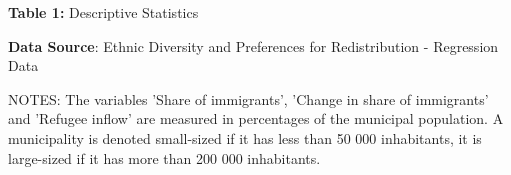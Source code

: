 \documentclass[12pt,a4paper]{standalone}
\begin{document}
\begin{minipage}[c][15cm]{1.8 \textwidth}

\thispagestyle{empty}

\begin{table}
\centering
\caption*{\textbf{Table 1:} Descriptive Statistics}

\begin{threeparttable}
 

    \begin{tablenotes}
    \item \textbf{Data Source}:
    Ethnic Diversity and Preferences for Redistribution - 		Regression Data 
    \item NOTES:
    The variables 'Share of immigrants', 'Change in share of immigrants' and 'Refugee inflow' are measured in percentages of the municipal population. A municipality is denoted small-sized if it has less than 50 000 inhabitants, it is large-sized if it has more than 200 000 inhabitants.
    
	
    \end{tablenotes}
\end{threeparttable}
\end{table}

\end{minipage}
\end{document}
